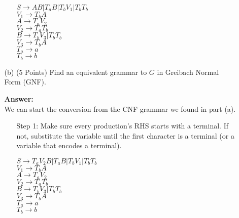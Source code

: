 \documentclass[12pt]{article}
\begin{document}
\begin{spacing}{1.5}
\begin{enumerate}
\begin{enumerate}
\begin{enumerate}
                                          $S \rightarrow AB | T_aB | T_bV_1 | T_bT_b$ \\
                                          $V_1 \rightarrow T_bA$ \\
                                          $A \rightarrow T_aV_2$ \\
                                          $V_2 \rightarrow T_aT_b$ \\
                                          $B \rightarrow T_bV_3 | T_bT_b$ \\
                                          $V_3 \rightarrow T_bA$ \\
                                          $T_a \rightarrow a$ \\
                                          $T_b \rightarrow b$
                              \end{enumerate}

                              \newpage
                        \item[(b)] (5 Points) Find an equivalent grammar to $G$ in Greibach Normal Form (GNF).

                              \textbf{Answer:} \\
                              We can start the conversion from the CNF grammar we found in part (a).

                              \begin{enumerate}
                                    \item[Step 1:] Make sure every production's RHS starts with a terminal. If not, substitute the variable until the first character is a terminal (or a variable that encodes a terminal).

                                          $S \rightarrow T_aV_2B | T_aB | T_bV_1 | T_bT_b$ \\
                                          $V_1 \rightarrow T_bA$ \\
                                          $A \rightarrow T_aV_2$ \\
                                          $V_2 \rightarrow T_aT_b$ \\
                                          $B \rightarrow T_bV_3 | T_bT_b$ \\
                                          $V_3 \rightarrow T_bA$ \\
                                          $T_a \rightarrow a$ \\
                                          $T_b \rightarrow b$


\end{enumerate}
\end{enumerate}
\end{enumerate}
\end{spacing}
\end{document}
